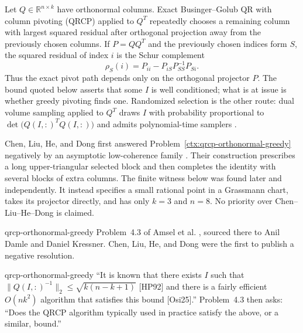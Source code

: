 
\begin{cxcredits}
\end{cxcredits}

\begin{cxcontext}
Let $Q\in\mathbb R^{n\times k}$ have orthonormal columns.  Exact
Businger--Golub QR with column pivoting (QRCP) applied to $Q^T$ repeatedly
chooses a remaining column with largest squared residual after orthogonal
projection away from the previously chosen columns.  If $P=QQ^T$ and the
previously chosen indices form $S$, the squared residual of index $i$ is the
Schur complement
\[
 \rho_S(i)=P_{ii}-P_{iS}P_{SS}^{-1}P_{Si}.
\]
Thus the exact pivot path depends only on the orthogonal projector $P$.
The bound quoted below asserts that some $I$ is well conditioned; what is at
issue is whether greedy pivoting finds one.  Randomized selection is the other
route: dual volume sampling applied to $Q^T$ draws $I$ with probability
proportional to $\det\bigl(Q(I,:)^TQ(I,:)\bigr)$ and admits polynomial-time
samplers \citep{LiJegelkaSra2017}.

Chen, Liu, He, and Dong first answered
Problem~\ref{ctx:qrcp-orthonormal-greedy} negatively by an asymptotic
low-coherence family \cite{ChenLiuHeDong2026}.  Their construction
prescribes a long upper-triangular selected block and then completes the
identity with several blocks of extra columns.  The finite witness below was
found later and independently.  It instead specifies a small rational point
in a Grassmann chart, takes its projector directly, and has only $k=3$ and
$n=8$.  No priority over Chen--Liu--He--Dong is claimed.
\end{cxcontext}

\begin{cxsource}{qrcp-orthonormal-greedy}
Problem~4.3 of Amsel et al. \cite{AmselEtAl2026}, sourced there to Anil Damle
and Daniel Kressner.  Chen, Liu, He, and Dong \cite{ChenLiuHeDong2026} were
the first to publish a negative resolution.
\end{cxsource}

\begin{cxstatement}{qrcp-orthonormal-greedy}
``It is known that there exists $I$ such that
$\|Q(I,:)^{-1}\|_2\leq\sqrt{k(n-k+1)}$ [HP92] and there is a fairly efficient
$O(nk^2)$ algorithm that satisfies this bound [Osi25].''  Problem~4.3 then
asks: ``Does the QRCP algorithm typically used in practice satisfy the above,
or a similar, bound.''
\end{cxstatement}

